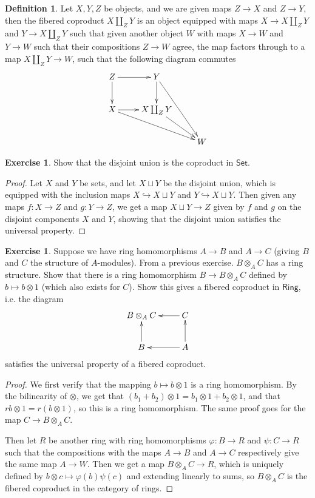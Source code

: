 \documentclass[psamsfonts]{amsart}
\theoremstyle{definition}
\newtheorem{defn}[thm]{Definition}
\newtheorem{exer}[thm]{Exercise}
\theoremstyle{remark}
\begin{document}
%
\begin{defn}
Let $X,Y,Z$ be objects, and we are given maps $Z \to X$ and $Z \to Y$, then the fibered coproduct $X \coprod_Z Y$ is an object equipped with maps $X \to X \coprod_Z Y$ and $Y \to X \coprod_Z Y$ such that given another object $W$ with maps $X \to W$ and $Y \to W$ such that their compositions $Z \to W$ agree, the map factors through to a map $X \coprod_Z Y \to W$, such that the following diagram commutes
$$\xymatrix{
Z \ar[d] \ar[r] & Y \ar[d] \ar[ddr]\\
X \ar[r] \ar[drr] & X \coprod_Z Y  \ar[dr]\\ 
& & W
}$$
\end{defn}
%
\begin{exer}
Show that the disjoint union is the coproduct in $\mathsf{Set}$.
\end{exer}
%
\begin{proof}
Let $X$ and $Y$ be sets, and let $X \sqcup Y$ be the disjoint union, which is equipped with the inclusion maps $X \hookrightarrow X \sqcup Y$ and $Y \hookrightarrow X \sqcup Y$. Then given any maps $f: X \to Z$ and $g: Y \to Z$, we get a map $X \sqcup Y \to Z$ given by $f$ and $g$ on the disjoint components $X$ and $Y$, showing that the disjoint union satisfies the universal property.
\end{proof}
%
\begin{exer}
Suppose we have ring homomorphisms $A \to B$ and $A \to C$ (giving $B$ and $C$ the structure of $A$-modules). From a previous exercise. $B \otimes_A C$ has a ring structure. Show that there is a ring homomorphism $B \to B \otimes_A C$ defined by $b \mapsto b \otimes 1$ (which also exists for $C$). Show this gives a fibered coproduct in $\mathsf{Ring}$, i.e. the diagram
$$\xymatrix{
B \otimes_A C & C \ar[l] \\
B \ar[u] & A \ar[l] \ar[u]
}$$
satisfies the universal property of a fibered coproduct.
\end{exer}
%
\begin{proof}
We first verify that the mapping $b \mapsto b \otimes 1$ is a ring homomorphism. By the bilinearity of $\otimes$, we get that $(b_1 + b_2) \otimes 1 = b_1 \otimes 1 + b_2 \otimes 1$, and that $rb \otimes 1 = r(b \otimes 1)$, so this is a ring homomorphism. The same proof goes for the map $C \to B \otimes_A C$. 

Then let $R$ be another ring with ring homomorphisms $\varphi: B \to R$ and $\psi: C \to R$ such that the compositions with the maps $A \to B$ and $A \to C$ respectively give the same map $A \to W$. Then we get a map $B \otimes_A C \to R$, which is uniquely defined by $b \otimes c \mapsto \varphi(b)\psi(c)$ and extending linearly to sums, so $B \otimes_A C$ is the fibered coproduct in the category of rings.
\end{proof}
\end{document}
